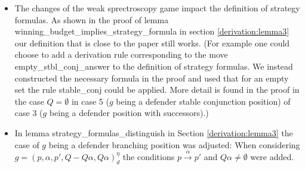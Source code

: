 \begin{itemize}
\item The changes of the weak sprectroscopy game impact the definition of strategy formulas. As shown in the proof 
of lemma winning\_budget\_implies\_strategy\_formula in section \ref{derivation:lemma3} our definition that is close 
to the paper still works. (For example one could choose to add a derivation rule corresponding to the move empty\_stbl\_conj\_answer to the definition 
of strategy formulas. We instead constructed the necessary formula in the proof and used that for an empty set the rule stable\_conj could be applied.
More detail is found in the proof in the case $Q=\emptyset$ in case 5 ($g$ being a defender stable conjunction position) 
of case 3 ($g$ being a defender position with successors).)
\item In lemma strategy\_formulas\_distinguish in Section \ref{derivation:lemma3} the case of $g$ being a defender branching position was adjusted: 
When considering $g=(p,\alpha ,p', Q- Q \alpha, Q \alpha)_d^\eta$ the conditions $p \overset{\alpha}{\longrightarrow} p'$ and $Q \alpha \neq \emptyset$ were 
added. 
\end{itemize}